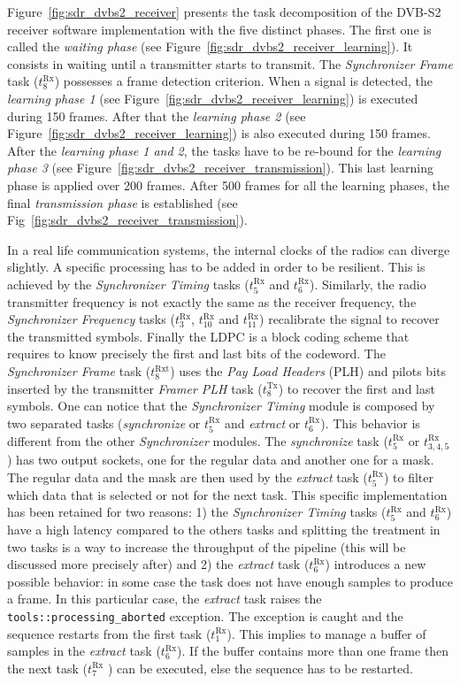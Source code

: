 Figure~\ref{fig:sdr_dvbs2_receiver} presents the task decomposition of the
DVB-S2 receiver software implementation with the five distinct phases. The first
one is called the \emph{waiting phase} (see
Figure~\ref{fig:sdr_dvbs2_receiver_learning}). It consists in waiting until a
transmitter starts to transmit. The \emph{Synchronizer Frame} task
($t^\text{Rx}_8$) possesses a frame detection criterion. When a signal is
detected, the \emph{learning phase 1} (see
Figure~\ref{fig:sdr_dvbs2_receiver_learning}) is executed during 150 frames.
After that the \emph{learning phase 2} (see
Figure~\ref{fig:sdr_dvbs2_receiver_learning}) is also executed during 150
frames. After the \emph{learning phase 1 and 2}, the tasks have to be re-bound
for the \emph{learning phase 3} (see
Figure~\ref{fig:sdr_dvbs2_receiver_transmission}). This last learning phase is
applied over 200 frames. After 500 frames for all the learning phases, the final
\emph{transmission phase} is established (see
Fig~\ref{fig:sdr_dvbs2_receiver_transmission}).

In a real life communication systems, the internal clocks of the radios can
diverge slightly. A specific processing has to be added in order to be
resilient. This is achieved by the \emph{Synchronizer Timing} tasks
($t^\text{Rx}_5$ and $t^\text{Rx}_6$). Similarly, the radio transmitter
frequency is not exactly the same as the receiver frequency, the
\emph{Synchronizer Frequency} tasks ($t^\text{Rx}_3$, $t^\text{Rx}_{10}$ and
$t^\text{Rx}_{11}$) recalibrate the signal to recover the transmitted symbols.
Finally the LDPC is a block coding scheme that requires to know precisely the
first and last bits of the codeword. The \emph{Synchronizer Frame} task
($t^\text{Rxt}_8$) uses the \emph{Pay Load Headers} (PLH) and pilots bits
inserted by the transmitter \emph{Framer PLH} task ($t^\text{Tx}_8$) to recover
the first and last symbols. One can notice that the \emph{Synchronizer Timing}
module is composed by two separated tasks (\emph{synchronize} or $t^\text{Rx}_5$
and \emph{extract} or $t^\text{Rx}_6$). This behavior is different from the
other \emph{Synchronizer} modules. The \emph{synchronize} task ($t^\text{Rx}_5$
or $t^\text{Rx}_{3,4,5}$) has two output sockets, one for the regular data and
another one for a mask. The regular data and the mask are then used by the
\emph{extract} task ($t^\text{Rx}_5$) to filter which data that is selected or
not for the next task. This specific implementation has been retained for two
reasons: 1) the \emph{Synchronizer Timing} tasks ($t^\text{Rx}_5$ and
$t^\text{Rx}_6$) have a high latency compared to the others tasks and splitting
the treatment in two tasks is a way to increase the throughput of the pipeline
(this will be discussed more precisely after) and 2) the \emph{extract} task
($t^\text{Rx}_6$) introduces a new possible behavior: in some case the task does
not have enough samples to produce a frame. In this particular case, the
\emph{extract} task raises the \verb|tools::processing_aborted| exception. The
exception is caught and the sequence restarts from the first task
($t^\text{Rx}_1$). This implies to manage a buffer of samples in the
\emph{extract} task ($t^\text{Rx}_6$). If the buffer contains more than one
frame then the next task ($t^\text{Rx}_7$ ) can be executed, else the sequence
has to be restarted.

